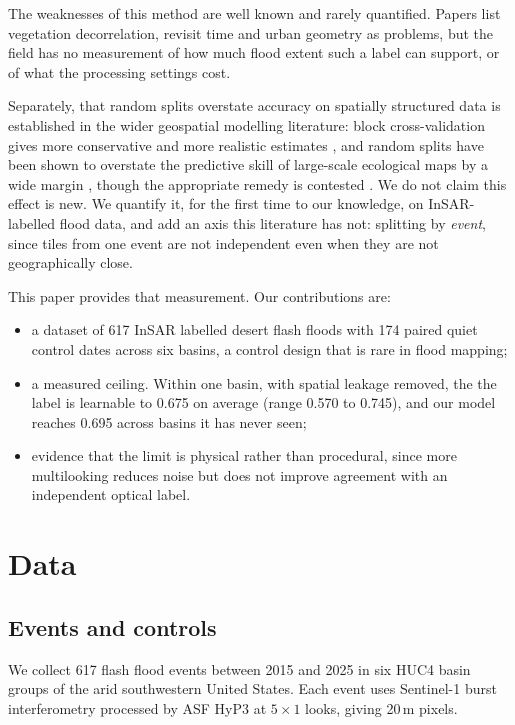 \documentclass[10pt,conference]{IEEEtran}
\begin{document}
The weaknesses of this method are well known and rarely quantified. Papers list
vegetation decorrelation, revisit time and urban geometry as problems, but the
field has no measurement of how much flood extent such a label can support, or
of what the processing settings cost.

Separately, that random splits overstate accuracy on spatially structured data
is established in the wider geospatial modelling literature: block
cross-validation gives more conservative and more realistic estimates
\cite{roberts2017}, and random splits have been shown to overstate the
predictive skill of large-scale ecological maps by a wide margin
\cite{ploton2020}, though the appropriate remedy is contested
\cite{wadoux2021,meyer2022}. We do not claim this effect is new. We quantify it,
for the first time to our knowledge, on InSAR-labelled flood data, and add an
axis this literature has not: splitting by \emph{event}, since tiles from one
event are not independent even when they are not geographically close.

This paper provides that measurement. Our contributions are:

\begin{itemize}
\item a dataset of 617 InSAR labelled desert flash floods with 174 paired quiet
      control dates across six basins, a control design that is rare in flood
      mapping;
\item a measured ceiling. Within one basin, with spatial leakage removed, the
      the label is learnable to 0.675 on average (range 0.570 to 0.745), and
      our model reaches 0.695 across basins it has never seen;
\item evidence that the limit is physical rather than procedural, since more
      multilooking reduces noise but does not improve agreement with an
      independent optical label.
\end{itemize}

\section{Data}

\subsection{Events and controls}
We collect 617 flash flood events between 2015 and 2025 in six HUC4 basin
groups of the arid southwestern United States. Each event uses Sentinel-1 burst
interferometry processed by ASF HyP3 at $5\times1$ looks, giving 20\,m pixels.
\end{document}
